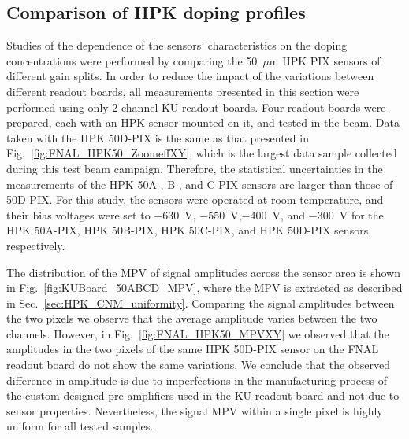 \documentclass[preprint,1p]{elsarticle}
\begin{document}
\subsection{Comparison of HPK doping profiles}
\label{sec:HPKdoping}

Studies of the dependence of the sensors' characteristics on the doping
concentrations were performed by comparing the 50~$\mu$m HPK PIX sensors of
different gain splits. In order to reduce the impact of the variations between
different readout boards, all measurements presented in this section were
performed using only 2-channel KU readout boards. Four readout boards were
prepared, each with an HPK sensor mounted on it, and tested in the beam. Data
taken with the HPK 50D-PIX is the same as that presented in
Fig.~\ref{fig:FNAL_HPK50_ZoomeffXY}, which is the largest data sample collected
during this test beam campaign. Therefore, the statistical uncertainties in the
measurements of the HPK 50A-, B-, and C-PIX sensors are larger than those of
50D-PIX. For this study, the sensors were operated at room temperature, and 
their bias voltages were set to $-630$~V, $-550$~V,$-400$~V, and $-300$~V
for the HPK 50A-PIX, HPK 50B-PIX, HPK 50C-PIX, and HPK 50D-PIX sensors, respectively.


The distribution of the MPV of signal amplitudes across the sensor area is shown in
Fig.~\ref{fig:KUBoard_50ABCD_MPV}, where the MPV is extracted as described in
Sec.~\ref{sec:HPK_CNM_uniformity}. Comparing the signal amplitudes between the
two pixels we observe that the average amplitude varies between the two channels. 
However, in Fig.~\ref{fig:FNAL_HPK50_MPVXY} we observed that the amplitudes in the
two pixels of the same HPK 50D-PIX sensor on the FNAL readout board do not show
the same variations. We conclude that the observed difference in amplitude
is due to imperfections in the manufacturing process of the custom-designed
pre-amplifiers used in the KU readout board and not due to
sensor properties. Nevertheless, the signal MPV within a
single pixel is highly uniform for all tested samples. 
\end{document}
